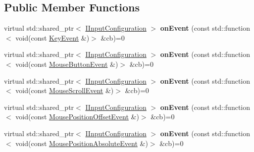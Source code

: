 \subsection*{Public Member Functions}
\begin{DoxyCompactItemize}
\item 
virtual std\+::shared\+\_\+ptr$<$ \hyperlink{class_s_l_1_1_input___lite_1_1_i_input_configuration}{I\+Input\+Configuration} $>$ {\bfseries on\+Event} (const std\+::function$<$ void(const \hyperlink{struct_s_l_1_1_input___lite_1_1_key_event}{Key\+Event} \&)$>$ \&cb)=0\hypertarget{class_s_l_1_1_input___lite_1_1_i_input_configuration_a156660809e87c334a0fc21ab080c98bf}{}\label{class_s_l_1_1_input___lite_1_1_i_input_configuration_a156660809e87c334a0fc21ab080c98bf}

\item 
virtual std\+::shared\+\_\+ptr$<$ \hyperlink{class_s_l_1_1_input___lite_1_1_i_input_configuration}{I\+Input\+Configuration} $>$ {\bfseries on\+Event} (const std\+::function$<$ void(const \hyperlink{struct_s_l_1_1_input___lite_1_1_mouse_button_event}{Mouse\+Button\+Event} \&)$>$ \&cb)=0\hypertarget{class_s_l_1_1_input___lite_1_1_i_input_configuration_a406aeb44f8c74b869889e2146801d903}{}\label{class_s_l_1_1_input___lite_1_1_i_input_configuration_a406aeb44f8c74b869889e2146801d903}

\item 
virtual std\+::shared\+\_\+ptr$<$ \hyperlink{class_s_l_1_1_input___lite_1_1_i_input_configuration}{I\+Input\+Configuration} $>$ {\bfseries on\+Event} (const std\+::function$<$ void(const \hyperlink{struct_s_l_1_1_input___lite_1_1_mouse_scroll_event}{Mouse\+Scroll\+Event} \&)$>$ \&cb)=0\hypertarget{class_s_l_1_1_input___lite_1_1_i_input_configuration_ae986d5f44e60037643e2d36f11e6efdd}{}\label{class_s_l_1_1_input___lite_1_1_i_input_configuration_ae986d5f44e60037643e2d36f11e6efdd}

\item 
virtual std\+::shared\+\_\+ptr$<$ \hyperlink{class_s_l_1_1_input___lite_1_1_i_input_configuration}{I\+Input\+Configuration} $>$ {\bfseries on\+Event} (const std\+::function$<$ void(const \hyperlink{struct_s_l_1_1_input___lite_1_1_mouse_position_offset_event}{Mouse\+Position\+Offset\+Event} \&)$>$ \&cb)=0\hypertarget{class_s_l_1_1_input___lite_1_1_i_input_configuration_ad8bb649a38898708aab82673772e3d3e}{}\label{class_s_l_1_1_input___lite_1_1_i_input_configuration_ad8bb649a38898708aab82673772e3d3e}

\item 
virtual std\+::shared\+\_\+ptr$<$ \hyperlink{class_s_l_1_1_input___lite_1_1_i_input_configuration}{I\+Input\+Configuration} $>$ {\bfseries on\+Event} (const std\+::function$<$ void(const \hyperlink{struct_s_l_1_1_input___lite_1_1_mouse_position_absolute_event}{Mouse\+Position\+Absolute\+Event} \&)$>$ \&cb)=0\hypertarget{class_s_l_1_1_input___lite_1_1_i_input_configuration_a0064e4815d2ef4c66e81846597a3c7f9}{}\label{class_s_l_1_1_input___lite_1_1_i_input_configuration_a0064e4815d2ef4c66e81846597a3c7f9}


\end{DoxyCompactItemize}
